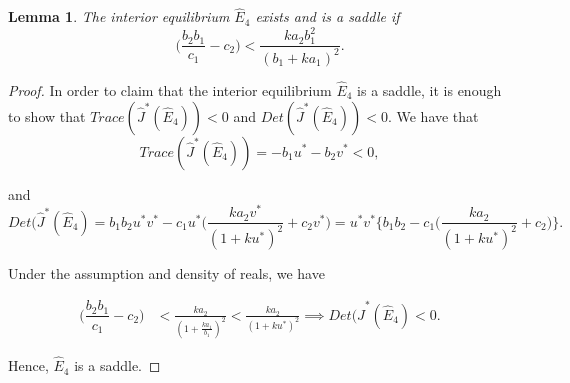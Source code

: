 \documentclass[10pt]{amsart}
\newtheorem{theorem}{Theorem}[section]
\newtheorem{lemma}[theorem]{Lemma}
\theoremstyle{definition}
\begin{document}


\begin{lemma}\label{ce_strong}
	The interior equilibrium $\widehat{E}_4$ exists and is a saddle if 
	\[ \Big( \dfrac{b_2b_1}{c_1} -c_2\Big) <\frac{k a_2b_1^2}{(b_1+ka_1)^2}.\]
\end{lemma}




\begin{proof}
	In order to claim that the interior equilibrium $\widehat{E}_4$ is a saddle, it is enough to show that $Trace(\widehat{J}^*(\widehat{E}_4))<0$ and $Det(\widehat{J}^*(\widehat{E}_4))<0.$
	We have that
	\[  Trace(\widehat{J}^*(\widehat{E}_4)) = -b_1 u^* -b_2 v^*<0,\]
	
	and
	\[ Det(\widehat{J}^*(\widehat{E}_4) = b_1b_2 u^* v^* - c_1u^* \Big( \dfrac{ka_2v^*}{(1+ku^*)^2} +c_2 v^* \Big) = u^* v^* \Big\{ b_1b_2 - c_1 \Big( \dfrac{k a_2}{(1+ku^*)^2} + c_2\Big) \Big\}.  \]
	
	
	Under the assumption and density of reals, we have 
	
	
	\begin{align*}
		\Big( \dfrac{b_2b_1}{c_1} -c_2\Big) &<\frac{k a_2}{(1+\frac{ka_1}{b_1})^2}  <\frac{k a_2}{(1+ku^*)^2} \implies Det(\widehat{J}^*(\widehat{E}_4)<0.
	\end{align*}
	
	Hence, $\widehat{E}_4$ is a saddle.
\end{proof}
\end{document}
